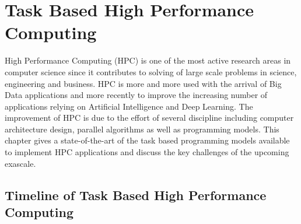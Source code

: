 \chapter{Task Based High Performance Computing \label{chap:hpc}}
High Performance Computing (HPC) is one of the most active research areas in computer science since it contributes to solving of large scale problems in science, engineering and business.
HPC is more and more used with the arrival of Big Data applications and more recently to improve the increasing number of applications relying on Artificial Intelligence and Deep Learning.
The improvement of HPC is due to the effort of several discipline including computer architecture design, parallel algorithms as well as programming models.
This chapter gives a state-of-the-art of the task based programming models available to implement HPC applications and discuss the key challenges of the upcoming exascale.


\section{Timeline of Task Based High Performance Computing}

